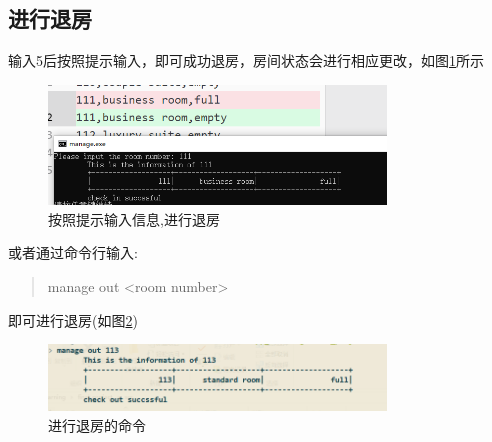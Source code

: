 \documentclass[UTF8]{ctexart}
\begin{document}
  \subsection{进行退房}
    输入5后按照提示输入，即可成功退房，房间状态会进行相应更改，如图\ref{fig:5_1}所示
    \begin{figure}[H]
      \centering
      \includegraphics[width=0.8\textwidth]{5_1}
      \caption{按照提示输入信息,进行退房}
      \label{fig:5_1}
    \end{figure}
    或者通过命令行输入:
    \begin{quote}
      manage out <room number>
    \end{quote}
    即可进行退房(如图\ref{fig:c_5})
    \begin{figure}[H]
      \centering
      \includegraphics[width=0.8\textwidth]{c_5}
      \caption{进行退房的命令}
      \label{fig:c_5}
    \end{figure}
\end{document}
